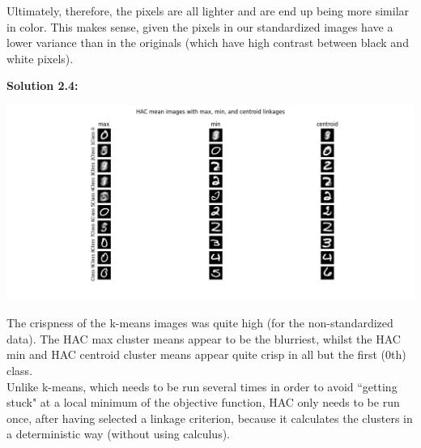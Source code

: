 \documentclass[submit]{harvardml}
\begin{document}
Ultimately, therefore, the pixels are all lighter and are end up being more similar in color. This makes sense, given the pixels in our standardized images have a lower variance than in the originals (which have high contrast between black and white pixels).

\noindent\textbf{Solution 2.4:}\\
\begin{center}
    \includegraphics[scale=0.6]{2.4.png}
\end{center}
The crispness of the k-means images was quite high (for the non-standardized data). The HAC max cluster means appear to be the blurriest, whilst the HAC min and HAC centroid cluster means appear quite crisp in all but the first (0th) class.\\

Unlike k-means, which needs to be run several times in order to avoid ``getting stuck" at a local minimum of the objective function, HAC only needs to be run once, after having selected a linkage criterion, because it calculates the clusters in a deterministic way (without using calculus).
\end{document}
